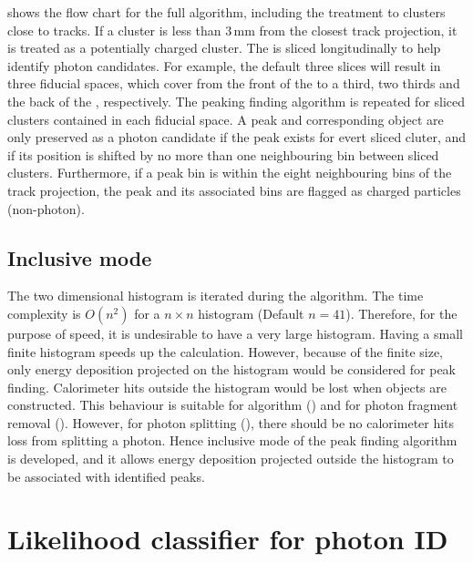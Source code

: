  shows the flow chart for the full \peakFinding algorithm, including the treatment to clusters close to tracks. If a cluster is less than 3\,mm from the closest track projection, it is treated as a potentially charged cluster. The \ECAL is sliced longitudinally to help identify photon candidates. For example, the default three slices will result in three \ECAL fiducial spaces, which cover from the front of the \ECAL to a third, two thirds and the back of the \ECAL, respectively. The peaking finding algorithm is repeated for sliced clusters contained in each fiducial space. A peak and corresponding \ShowerPeak object  are only preserved as a photon candidate if the peak exists for evert sliced cluter, and if its position is shifted by no more than one neighbouring bin between sliced clusters. Furthermore, if a peak bin is within the eight neighbouring bins of the track projection, the peak and its associated bins are flagged as charged particles (non-photon).

\subsection{Inclusive mode}
\label{sec:photonPeakFindingInclusive}

The two dimensional histogram is iterated during the algorithm. The time complexity is $O(n^2)$ for a $n \times n$ histogram (Default $n = 41$). Therefore, for the purpose of speed, it is undesirable to have a very large histogram. Having a small finite histogram speeds up the calculation. However, because of the finite size, only energy deposition projected on the histogram would be considered for peak finding. Calorimeter hits outside the histogram would be lost when \ShowerPeak objects are constructed. This behaviour is suitable for \PhotonReconstruction algorithm () and for photon fragment removal (). However, for photon splitting (), there should be no calorimeter hits loss from splitting a photon. Hence inclusive mode of the peak finding algorithm is developed, and it allows energy deposition projected outside the histogram to be associated with identified peaks.


\section{Likelihood classifier for photon ID}
\label{sec:photonLikelihood}

